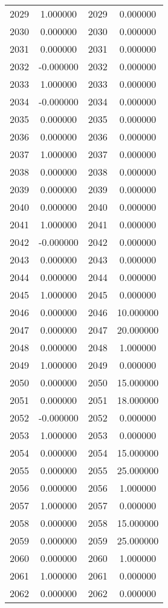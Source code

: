 \documentclass[12pt]{article}
\begin{document}
\begin{longtable}{@{}cccc@{}}
2029 & 1.000000 & 2029 & 0.000000 \\
2030 & 0.000000 & 2030 & 0.000000 \\
2031 & 0.000000 & 2031 & 0.000000 \\
2032 & -0.000000 & 2032 & 0.000000 \\
2033 & 1.000000 & 2033 & 0.000000 \\
2034 & -0.000000 & 2034 & 0.000000 \\
2035 & 0.000000 & 2035 & 0.000000 \\
2036 & 0.000000 & 2036 & 0.000000 \\
2037 & 1.000000 & 2037 & 0.000000 \\
2038 & 0.000000 & 2038 & 0.000000 \\
2039 & 0.000000 & 2039 & 0.000000 \\
2040 & 0.000000 & 2040 & 0.000000 \\
2041 & 1.000000 & 2041 & 0.000000 \\
2042 & -0.000000 & 2042 & 0.000000 \\
2043 & 0.000000 & 2043 & 0.000000 \\
2044 & 0.000000 & 2044 & 0.000000 \\
2045 & 1.000000 & 2045 & 0.000000 \\
2046 & 0.000000 & 2046 & 10.000000 \\
2047 & 0.000000 & 2047 & 20.000000 \\
2048 & 0.000000 & 2048 & 1.000000 \\
2049 & 1.000000 & 2049 & 0.000000 \\
2050 & 0.000000 & 2050 & 15.000000 \\
2051 & 0.000000 & 2051 & 18.000000 \\
2052 & -0.000000 & 2052 & 0.000000 \\
2053 & 1.000000 & 2053 & 0.000000 \\
2054 & 0.000000 & 2054 & 15.000000 \\
2055 & 0.000000 & 2055 & 25.000000 \\
2056 & 0.000000 & 2056 & 1.000000 \\
2057 & 1.000000 & 2057 & 0.000000 \\
2058 & 0.000000 & 2058 & 15.000000 \\
2059 & 0.000000 & 2059 & 25.000000 \\
2060 & 0.000000 & 2060 & 1.000000 \\
2061 & 1.000000 & 2061 & 0.000000 \\
2062 & 0.000000 & 2062 & 0.000000 \\

\end{longtable}
\end{document}
